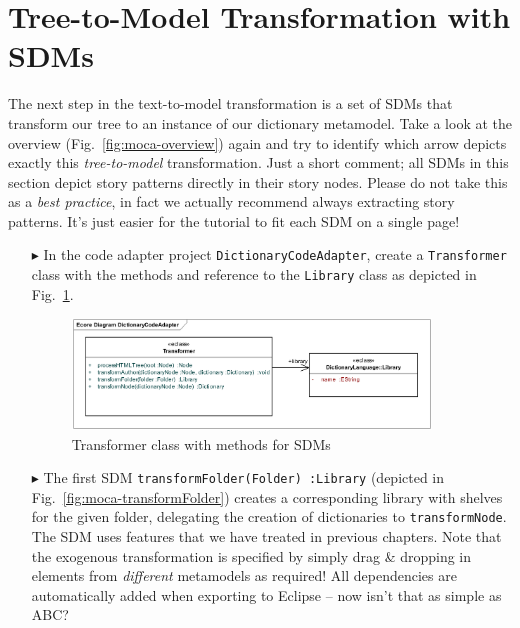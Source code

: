 \section{Tree-to-Model Transformation with SDMs}

The next step in the text-to-model transformation is a set of SDMs that transform our tree to an instance of our dictionary metamodel.
Take a look at the overview (Fig.~\ref{fig:moca-overview}) again and try to identify which arrow depicts exactly this \emph{tree-to-model} transformation.
Just a short comment;  all SDMs in this section depict story patterns directly in their story nodes.
Please do not take this as a \emph{best practice}, in fact we actually recommend always extracting story patterns.
It's just easier for the tutorial to fit each SDM on a single page!

\begin{enumerate}
  \item[$\blacktriangleright$]  In the code adapter project \texttt{DictionaryCodeAdapter}, create a \texttt{Trans\-for\-mer} class with the methods and reference to the \texttt{Library} class as depicted in Fig.~\ref{fig:moca-DictionaryCodeAdapter}.
\begin{figure}[!htbp]
\begin{center}
 \includegraphics[width=0.9\textwidth]{pics/moca/3MocaTreeToModel/DictionaryCodeAdapter}
  \caption{Transformer class with methods for SDMs}
  \label{fig:moca-DictionaryCodeAdapter}
\end{center}
\end{figure}
\item[$\blacktriangleright$]  The first SDM \texttt{transformFolder(Folder)~:Library} (depicted in Fig.~\ref{fig:moca-transformFolder}) creates a corresponding library with shelves for the given folder, delegating the creation of dictionaries to \texttt{transformNode}.
The SDM uses features that we have treated in previous chapters.
Note that the exogenous transformation is specified by simply drag \& dropping in elements from \emph{different} metamodels as required!
All dependencies are automatically added when exporting to Eclipse -- now isn't that as simple as ABC?

\end{enumerate}
